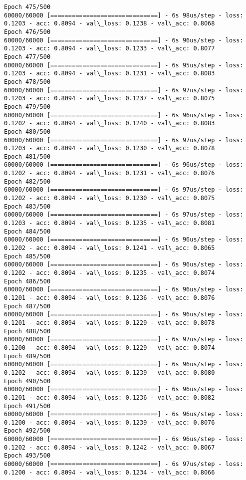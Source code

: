 \documentclass[11pt]{article}
\begin{document}
\begin{Verbatim}[commandchars=\\\{\}]
Epoch 475/500
60000/60000 [==============================] - 6s 98us/step - loss: 0.1203 - acc: 0.8094 - val\_loss: 0.1238 - val\_acc: 0.8068
Epoch 476/500
60000/60000 [==============================] - 6s 96us/step - loss: 0.1203 - acc: 0.8094 - val\_loss: 0.1233 - val\_acc: 0.8077
Epoch 477/500
60000/60000 [==============================] - 6s 95us/step - loss: 0.1203 - acc: 0.8094 - val\_loss: 0.1231 - val\_acc: 0.8083
Epoch 478/500
60000/60000 [==============================] - 6s 97us/step - loss: 0.1203 - acc: 0.8094 - val\_loss: 0.1237 - val\_acc: 0.8075
Epoch 479/500
60000/60000 [==============================] - 6s 96us/step - loss: 0.1202 - acc: 0.8094 - val\_loss: 0.1240 - val\_acc: 0.8083
Epoch 480/500
60000/60000 [==============================] - 6s 97us/step - loss: 0.1203 - acc: 0.8094 - val\_loss: 0.1230 - val\_acc: 0.8078
Epoch 481/500
60000/60000 [==============================] - 6s 96us/step - loss: 0.1202 - acc: 0.8094 - val\_loss: 0.1231 - val\_acc: 0.8076
Epoch 482/500
60000/60000 [==============================] - 6s 97us/step - loss: 0.1202 - acc: 0.8094 - val\_loss: 0.1230 - val\_acc: 0.8075
Epoch 483/500
60000/60000 [==============================] - 6s 97us/step - loss: 0.1203 - acc: 0.8094 - val\_loss: 0.1235 - val\_acc: 0.8081
Epoch 484/500
60000/60000 [==============================] - 6s 96us/step - loss: 0.1202 - acc: 0.8094 - val\_loss: 0.1241 - val\_acc: 0.8065
Epoch 485/500
60000/60000 [==============================] - 6s 96us/step - loss: 0.1202 - acc: 0.8094 - val\_loss: 0.1235 - val\_acc: 0.8074
Epoch 486/500
60000/60000 [==============================] - 6s 96us/step - loss: 0.1201 - acc: 0.8094 - val\_loss: 0.1236 - val\_acc: 0.8076
Epoch 487/500
60000/60000 [==============================] - 6s 96us/step - loss: 0.1201 - acc: 0.8094 - val\_loss: 0.1229 - val\_acc: 0.8078
Epoch 488/500
60000/60000 [==============================] - 6s 97us/step - loss: 0.1200 - acc: 0.8094 - val\_loss: 0.1229 - val\_acc: 0.8074
Epoch 489/500
60000/60000 [==============================] - 6s 96us/step - loss: 0.1202 - acc: 0.8094 - val\_loss: 0.1239 - val\_acc: 0.8080
Epoch 490/500
60000/60000 [==============================] - 6s 96us/step - loss: 0.1201 - acc: 0.8094 - val\_loss: 0.1236 - val\_acc: 0.8082
Epoch 491/500
60000/60000 [==============================] - 6s 96us/step - loss: 0.1200 - acc: 0.8094 - val\_loss: 0.1239 - val\_acc: 0.8076
Epoch 492/500
60000/60000 [==============================] - 6s 96us/step - loss: 0.1202 - acc: 0.8094 - val\_loss: 0.1242 - val\_acc: 0.8067
Epoch 493/500
60000/60000 [==============================] - 6s 97us/step - loss: 0.1200 - acc: 0.8094 - val\_loss: 0.1234 - val\_acc: 0.8066

\end{Verbatim}
\end{document}
